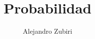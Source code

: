 \documentclass{report}
\author{Alejandro Zubiri}
\title{Probabilidad}
\begin{document}
\maketitle
\tableofcontents
\pagebreak




\end{document}
